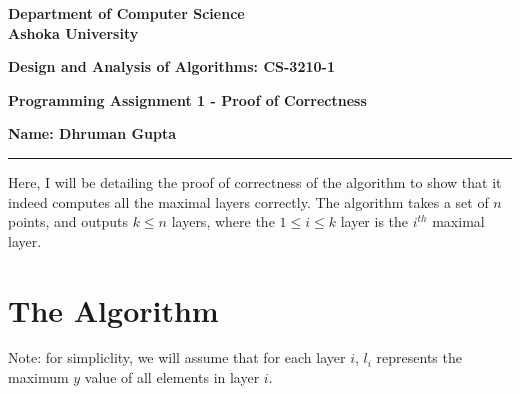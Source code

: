 \documentclass[a4paper]{article}
\begin{document}
\begin{center}
{\large \bf \color{red}  Department of Computer Science} \\
{\large \bf \color{red}  Ashoka University} \\

\vspace{0.1in}

{\large \bf \color{blue}  Design and Analysis of Algorithms: CS-3210-1}

\vspace{0.05in}

    { \bf \color{YellowOrange} Programming Assignment 1 - Proof of Correctness}
\end{center}
\medskip

{\textbf{Name: Dhruman Gupta} }

\bigskip
\hrule

\vspace{0.1in}

Here, I will be detailing the proof of correctness of the algorithm to show that it indeed computes all the maximal layers correctly. The algorithm takes a set of $n$ points, and outputs $k \leq n$ layers, where the $1 \leq i \leq k$ layer is the $i^{th}$ maximal layer.

\section*{The Algorithm}

Note: for simpliclity, we will assume that for each layer $i$, $l_i$ represents the maximum $y$ value of all elements in layer $i$.
\end{document}

